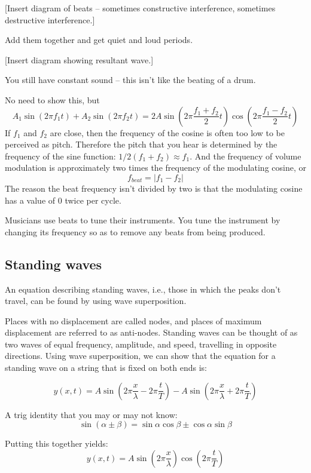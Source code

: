 [Insert diagram of beats -- sometimes constructive interference, sometimes destructive interference.]
\vspace{5cm}

Add them together and get quiet and loud periods.

[Insert diagram showing resultant wave.]
\vspace{5cm}

You still have constant sound -- this isn't like the beating of a drum.

No need to show this, but
$$A_1\sin(2\pi f_1 t)+A_2\sin(2\pi f_2 t)=2A\sin\left(2\pi\frac{f_1+f_2}{2}t\right)\cos\left(2\pi\frac{f_1-f_2}{2}t\right)$$
If $f_1$ and $f_2$ are close, then the frequency of the cosine is often too low to be perceived as pitch. Therefore the pitch that you hear is determined by the frequency of the sine function: $1/2(f_1+f_2)\approx f_1$. And the frequency of volume modulation is approximately two times the frequency of the modulating cosine, or
$$f_{beat}=|f_1-f_2|$$
The reason the beat frequency isn't divided by two is that the modulating cosine has a value of 0 twice per cycle.

Musicians use beats to tune their instruments. You tune the instrument by changing its frequency so as to remove any beats from being produced.


\subsection{Standing waves}
An equation describing standing waves, i.e., those in which the peaks don't travel, can be found by using wave superposition.

Places with no displacement are called nodes, and places of maximum displacement are referred to as anti-nodes. Standing waves can be thought of as two waves of equal frequency, amplitude, and speed, travelling in opposite directions. Using wave superposition, we can show that the equation for a standing wave on a string that is fixed on both ends is:

$$y(x,t)=A\sin\left(2\pi\frac{x}{\lambda}-2\pi\frac{t}{T}\right)- A\sin\left(2\pi\frac{x}{\lambda}+2\pi\frac{t}{T}\right)$$

A trig identity that you may or may not know:
$$\sin(\alpha\pm\beta)=\sin\alpha\cos\beta\pm\cos\alpha\sin\beta$$

Putting this together yields:
$$y(x,t)=A\sin\left(2\pi\frac{x}{\lambda}\right)\cos\left(2\pi\frac{t}{T}\right)$$

